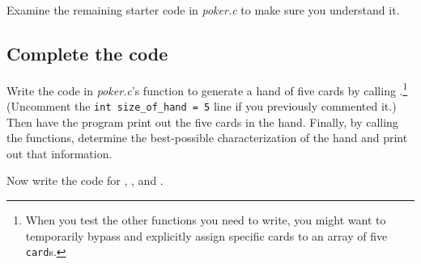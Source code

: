 Examine the remaining starter code in \textit{poker.c} to make sure you understand it.

\subsection{Complete the code} \label{subsec:completepoker}

Write the code in \textit{poker.c}'s  function to generate a hand of five cards by calling .\footnote{When you test the other functions you need to write, you might want to temporarily bypass  and explicitly assign specific cards to an array of five \lstinline{card}s.}
(Uncomment the \lstinline{int size_of_hand = 5} line if you previously commented it.)
Then have the program print out the five cards in the hand.
Finally, by calling the  functions, determine the best-possible characterization of the hand and print out that information.

Now write the code for , , and .